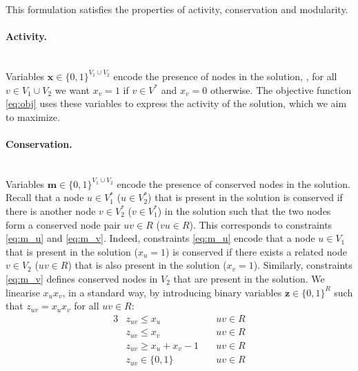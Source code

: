 		This formulation satisfies the properties of activity, conservation and modularity.

		\paragraph{Activity.}\mbox{}\\
		Variables $\mathbf{x} \in \{0, 1\}^{V_1 \cup V_2}$ encode the presence of nodes in the solution, \ie, for all $v \in V_1 \cup V_2$ we want $x_v = 1$ if $v \in V^*$ and $x_v = 0$ otherwise.
		The objective function \eqref{eq:obj} uses these variables to express the activity of the solution, which we aim to maximize.

		\paragraph{Conservation.}\mbox{}\\
		Variables $\mathbf{m} \in \{0, 1\}^{V_1 \cup V_2}$ encode the presence of conserved nodes in the solution.
		Recall that a node $u \in V_1^*$ ($u \in V_2^*$) that is present in the solution is conserved if there is another node $v \in V_2^*$ ($v \in V_1^*$) in the solution such that the two nodes form a conserved node pair $uv \in R$ ($vu \in R$).
		This corresponds to constraints \eqref{eq:m_u} and \eqref{eq:m_v}.
		Indeed, constraints \eqref{eq:m_u} encode that a node $u \in V_1$ that is present in the solution ($x_u = 1$) is conserved if there exists a related node $v \in V_2$ ($uv \in R$) that is also present in the solution ($x_v = 1$).
		Similarly, constraints \eqref{eq:m_v} defines conserved nodes in $V_2$ that are present in the solution.
		We linearise $x_ux_v$, in a standard way, by introducing binary variables $\mathbf{z} \in \{0,1\}^R$ such that $z_{uv} = x_ux_v$ for all $uv \in R$:
		\allowdisplaybreaks
		\begin{alignat}{3}
		\label{eq:z1} & z_{uv} \leq x_u                 & uv \in R\\
		\label{eq:z2} & z_{uv} \leq x_v                 & uv \in R\\
		\label{eq:z3} & z_{uv} \geq x_u + x_v - 1 \quad & uv \in R\\
		\label{eq:vars2} & z_{uv} \in \{0,1\} & uv \in R
		\end{alignat}

